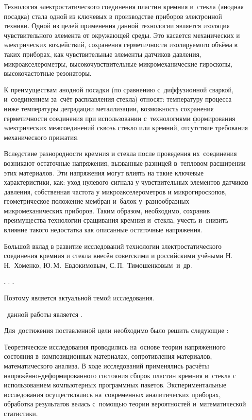 {\actuality}

Технология электростатического соединения пластин кремния и~стекла
(анодная посадка) стала одной из ключевых в производстве приборов
электронной техники. Одной из целей применения данной технологии является
изоляция чувствительного элемента от окружающей среды. Это касается
механических и электрических воздействий, сохранения герметичности
изолируемого объёма в таких приборах, как чувствительные элементы
датчиков давления, микроакселерометры, высокочувствительные
микромеханические гироскопы, высокочастотные резонаторы.

К преимуществам анодной посадки (по сравнению с~диффузионной сваркой,
и~соединением за~счёт расплавления стекла) относят: температуру
процесса ниже температуры деградации металлизации, возможность
сохранения герметичности соединения при использовании с~технологиями
формирования электрических межсоединений сквозь стекло или кремний,
отсутствие требования механического прижатия.

Вследствие разнородности кремния и стекла после проведения
их~соединения возникают остаточные напряжения, вызванные разницей
в~тепловом расширении этих материалов. Эти напряжения могут влиять
на такие ключевые характеристики, как:
уход нулевого сигнала
у чувствительных элементов датчиков давления, собственная частота
у микроакселерометров и микрогироскопов, геометрическое положение
мембран и~балок у~разнообразных микромеханических приборов.
Таким образом, необходимо, сохранив преимущества технологии сращивания
кремния и~стекла, учесть и~снизить влияние такого недостатка как
описанные остаточные напряжения.

Большой вклад в развитие исследований технологии электростатического
соединения кремния и стекла внесён советскими и российскими учёными
Н.\,Н.~Хоменко, Ю.\,М.~Евдокимовым, С.\,П.~Тимошенковым\ и~др.

%
\beforenedostati{}
\nedostati{}.
\nedostatii{}.
\nedostatiii{}.

Поэтому \MakeLowercase{\thesisTitleTXT}
является актуальной темой исследования.

\aim\ данной работы является
\MakeLowercase{\aimTextContent}.

Для~достижения поставленной цели необходимо было решить следующие {\tasks}:
\begin{enumerate}

\end{enumerate}

{\methods}
Теоретические исследования проводились на~основе теории напряжённого
состояния в~композиционных материалах, сопротивления материалов,
математического анализа.
В ходе исследований применялись расчёты напряжённо-деформированного
состояния сборок пластин кремния и~стекла с использованием
компьютерных программных пакетов.
Экспериментальные исследования осуществлялись
на~современных аналитических приборах, обработка результатов велась
с~помощью теории вероятностей и~математической статистики.

